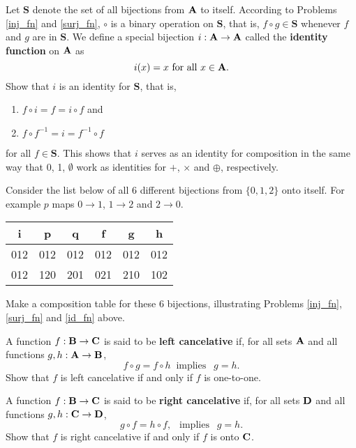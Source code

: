 \begin{prb}
\label{id_fn}
Let $\mathbf S$ denote the set of all bijections from $\mathbf A$ to itself.  According to Problems \ref{inj_fn} and \ref{surj_fn}, $\circ$ is a binary operation on $\mathbf S$, that is, $f\circ g \in \mathbf S$ whenever $f$ and $g$ are in $\mathbf S$.  We define a special bijection $i:\mathbf A \to \mathbf A$ called the
\textbf{identity function} on $\mathbf A$ as \[ i(x) = x \mbox{ for all } x\in \mathbf A. \]
Show that $i$ is an identity for $\mathbf S$, that is,
\begin{enumerate}
\item $f\circ i = f = i\circ f$ and
\item $f\circ f^{-1} = i = f^{-1}\circ f$
\end{enumerate}
for all $f \in \mathbf S$.  This shows that $i$ serves as an identity for composition in the same way that 0, 1, $\emptyset$ work as identities for $+$,
$\times$ and $\oplus$, respectively.
\end{prb}

\begin{prb}
Consider the list below of all 6 different bijections from $\{0,1,2\}$ onto itself. For example $p$ maps $0 \to 1$, $1 \to 2$ and $2 \to 0$.
\begin{table}[ht]
  \begin{center}
     \begin{tabular}{|| c | c | c | c | c | c ||}
     \hline
     i  &  p  &  q  &  f  &  g  &  h  \\ \hline\hline
    012 & 012 & 012 & 012 & 012 & 012 \\ \hline
    012 & 120 & 201 & 021 & 210 & 102 \\ \hline
        \end{tabular}
   \end{center}
  \end{table}
\noindent Make a composition table for these 6 bijections, illustrating Problems \ref{inj_fn}, \ref{surj_fn} and \ref{id_fn} above.
\end{prb}


\begin{prb}
A function $f:\mathbf B \to \mathbf C$ is said to be \textbf{left cancelative} if, for all sets $\mathbf A$ and all functions $g,h:\mathbf A \to \mathbf B$,
\[
 f \circ g = f \circ h \ \mbox{ implies } \ \  g = h.
 \]
 Show that $f$ is left cancelative if and only if $f$ is one-to-one.
\end{prb}

\begin{prb}
A function $f:\mathbf B \to \mathbf C$ is said to be \textbf{right cancelative} if, for all sets $\mathbf D$ and all functions $g,h:\mathbf C \to \mathbf D$,
\[
 g \circ f = h \circ f, \ \ \mbox{ implies } \ \ g = h.
 \]
 Show that $f$ is right cancelative if and only if $f$ is onto $\mathbf C$.
\end{prb}


